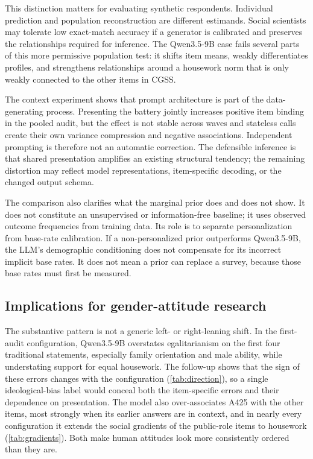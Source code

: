 \documentclass[11pt]{article}
\begin{document}
This distinction matters for evaluating synthetic respondents. Individual prediction and population reconstruction are different estimands. Social scientists may tolerate low exact-match accuracy if a generator is calibrated and preserves the relationships required for inference. The Qwen3.5-9B case fails several parts of this more permissive population test: it shifts item means, weakly differentiates profiles, and strengthens relationships around a housework norm that is only weakly connected to the other items in CGSS.

The context experiment shows that prompt architecture is part of the data-generating process. Presenting the battery jointly increases positive item binding in the pooled audit, but the effect is not stable across waves and stateless calls create their own variance compression and negative associations. Independent prompting is therefore not an automatic correction. The defensible inference is that shared presentation amplifies an existing structural tendency; the remaining distortion may reflect model representations, item-specific decoding, or the changed output schema.

The comparison also clarifies what the marginal prior does and does not show. It does not constitute an unsupervised or information-free baseline; it uses observed outcome frequencies from training data. Its role is to separate personalization from base-rate calibration. If a non-personalized prior outperforms Qwen3.5-9B, the LLM's demographic conditioning does not compensate for its incorrect implicit base rates. It does not mean a prior can replace a survey, because those base rates must first be measured.

\subsection{Implications for gender-attitude research}

The substantive pattern is not a generic left- or right-leaning shift. In the first-audit configuration, Qwen3.5-9B overstates egalitarianism on the first four traditional statements, especially family orientation and male ability, while understating support for equal housework. The follow-up shows that the sign of these errors changes with the configuration (\cref{tab:direction}), so a single ideological-bias label would conceal both the item-specific errors and their dependence on presentation. The model also over-associates A425 with the other items, most strongly when its earlier answers are in context, and in nearly every configuration it extends the social gradients of the public-role items to housework (\cref{tab:gradients}). Both make human attitudes look more consistently ordered than they are.
\end{document}

